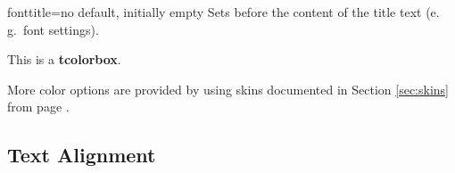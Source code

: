 \begin{docTcbKey}{fonttitle}{=}{no default, initially empty}
  Sets  before the content of the title text (e.\,g.\ font settings).
\begin{dispExample}
\begin{tcolorbox}[fonttitle=\sffamily\bfseries\large,title=Hello]
This is a \textbf{tcolorbox}.
\end{tcolorbox}
\end{dispExample}
\end{docTcbKey}

\bigskip
\begin{marker}
  More color options are provided by using skins documented in
  Section \ref{sec:skins} from page \pageref{sec:skins}.
\end{marker}


\clearpage
\subsection{Text Alignment}

